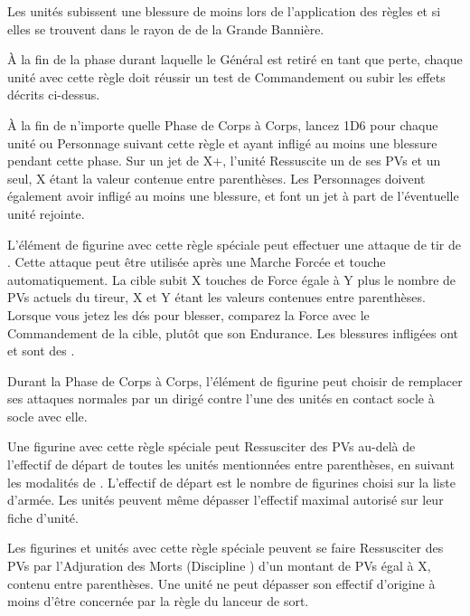 Les unités subissent une blessure de moins lors de l'application des règles \unstable et \ashestoashes si elles se trouvent dans le rayon de \holdyourground de la Grande Bannière. 

À la fin de la phase durant laquelle le Général est retiré en tant que perte, chaque unité avec cette règle doit réussir un test de Commandement ou subir les effets décrits ci-dessus.


À la fin de n'importe quelle Phase de Corps à Corps, lancez 1D6 pour chaque unité ou Personnage suivant cette règle et ayant infligé au moins une blessure pendant cette phase. Sur un jet de X+, l'unité Ressuscite un de ses PVs et un seul, X étant la valeur contenue entre parenthèses. Les Personnages doivent également avoir infligé au moins une blessure, et font un jet à part de l'éventuelle unité rejointe.


L'élément de figurine avec cette règle spéciale peut effectuer une attaque de tir de . Cette attaque peut être utilisée après une Marche Forcée et touche automatiquement. La cible subit X touches de Force égale à Y plus le nombre de PVs actuels du tireur, X et Y étant les valeurs contenues entre parenthèses. Lorsque vous jetez les dés pour blesser, comparez la Force avec le Commandement de la cible, plutôt que son Endurance. Les blessures infligées ont  et sont des \magicalattacks .

Durant la Phase de Corps à Corps, l'élément de figurine peut choisir de remplacer ses attaques normales par un \otherworldlyscream{} dirigé contre l'une des unités en contact socle à socle avec elle.

\armyspecialruleentry{\awaken{}}

Une figurine avec cette règle spéciale peut Ressusciter des PVs au-delà de l'effectif de départ de toutes les unités mentionnées entre parenthèses, en suivant les modalités de \raisewounds . L'effectif de départ est le nombre de figurines choisi sur la liste d'armée. Les unités peuvent même dépasser l'effectif maximal autorisé sur leur fiche d'unité.


Les figurines et unités avec cette règle spéciale peuvent se faire Ressusciter des PVs par l'Adjuration des Morts (Discipline \necromancy) d'un montant de PVs égal à X, contenu entre parenthèses. Une unité ne peut dépasser son effectif d'origine à moins d'être concernée par la règle \awaken{} du lanceur de sort.

